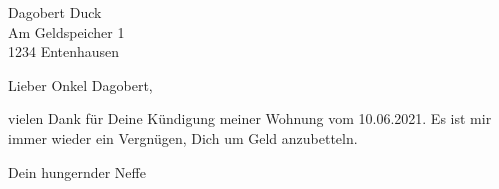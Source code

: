\documentclass[12pt,ngerman]{scrlttr2}
\begin{document}
\begin{letter}{Dagobert Duck \\ Am Geldspeicher 1 \\ 1234 Entenhausen}
\opening{Lieber Onkel Dagobert,}

vielen Dank  für Deine Kündigung meiner Wohnung vom 10.06.2021. Es ist mir immer wieder ein Vergnügen, Dich um Geld anzubetteln.

\blindtext[5]

\closing{Dein hungernder Neffe}
\end{letter}
\end{document}
